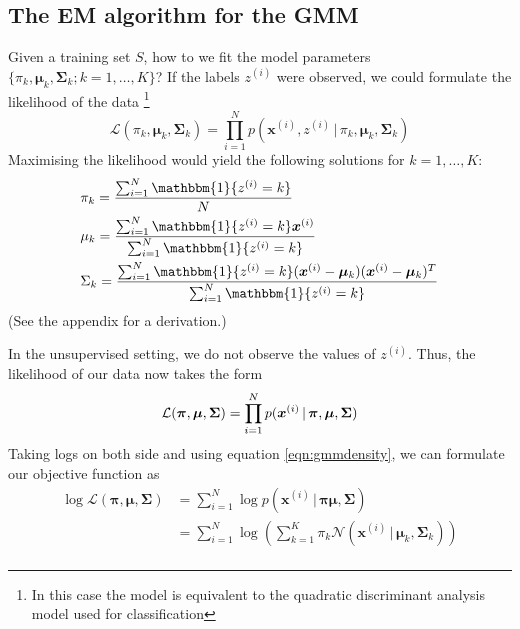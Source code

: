 \documentclass[final,3p,times,twocolumn]{elsarticle}
\begin{document}
\subsection{The EM algorithm for the GMM}
Given a training set $S$, how to we fit the model parameters $\{\pi_k, \boldsymbol \mu_k, \boldsymbol \Sigma_k; k=1,\dots,K\}$?
	If the labels $z^{(i)}$ were observed, we could formulate the likelihood of the data \footnote{In this case the model is equivalent to the quadratic discriminant analysis model used for classification} 
\begin{equation}
\mathcal{L}(\pi_k, \boldsymbol \mu_k, \boldsymbol \Sigma_k) = \prod_{i=1}^N p(\boldsymbol x^{(i)},z^{(i)}\,|\,\pi_k, \boldsymbol \mu_k, \boldsymbol \Sigma_k)
\label{eqn:LDAlikelihood}
\end{equation}
Maximising the likelihood would yield the following solutions for $k = 1,\dots,K$:
\begin{equation}
\begin{split}
&\pi_k = \frac{\sum_{i=1}^N \mathbbm{1}\{z^{(i)} = k\}}{N}\\
&\mu_k = \frac{\sum_{i=1}^N \mathbbm{1}\{z^{(i)} = k\} \boldsymbol{x}^{(i)}}{\sum_{i=1}^N \mathbbm{1}\{z^{(i)} = k\}}\\
&\Sigma_k = \frac{\sum_{i=1}^N \mathbbm{1}\{z^{(i)} = k\} (\boldsymbol{x}^{(i)} - \boldsymbol \mu_k)(\boldsymbol{x}^{(i)} - \boldsymbol \mu_k)^T}{\sum_{i=1}^N \mathbbm{1}\{z^{(i)} = k\}}\\
\end{split}
\end{equation}
(See the appendix for a derivation.)

In the unsupervised setting, we do not observe the values of $z^{(i)}$. 
Thus, the likelihood of our data now takes the form
\begin{equation}
	\mathcal{L}(\boldsymbol \pi, \boldsymbol \mu, \boldsymbol \Sigma) = \prod_{i=1}^N p(\boldsymbol x^{(i)}\,|\,\boldsymbol \pi, \boldsymbol \mu, \boldsymbol \Sigma)\\
\label{eqn:gmmLikelihood}
\end{equation}
Taking logs on both side and using equation \ref{eqn:gmmdensity}, we can formulate our objective function as
\begin{equation}
\begin{split}
\log\mathcal{L}(\boldsymbol \pi, \boldsymbol \mu, \boldsymbol \Sigma) &= \sum_{i=1}^N \log p(\boldsymbol x^{(i)}\,|\,\boldsymbol \pi \boldsymbol \mu, \boldsymbol \Sigma)\\
&= \sum_{i=1}^N \log \left(\sum_{k=1}^K \pi_k \mathcal{N}(\boldsymbol x^{(i)}\,|\, \boldsymbol \mu_k, \boldsymbol \Sigma_k)\right)\\
\end{split}
\label{eqn:gmmlogLikelihood}
\end{equation}
\end{document}
